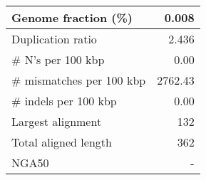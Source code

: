 \documentclass[12pt,a4paper]{article}
\begin{document}
\begin{table}[ht]
\begin{center}
\begin{tabular}{|l*{1}{|r}|}
Genome fraction (\%) & 0.008 \\ \hline
Duplication ratio & 2.436 \\ \hline
\# N's per 100 kbp & 0.00 \\ \hline
\# mismatches per 100 kbp & 2762.43 \\ \hline
\# indels per 100 kbp & 0.00 \\ \hline
Largest alignment & 132 \\ \hline
Total aligned length & 362 \\ \hline
NGA50 & - \\ \hline
\end{tabular}
\end{center}
\end{table}
\end{document}
